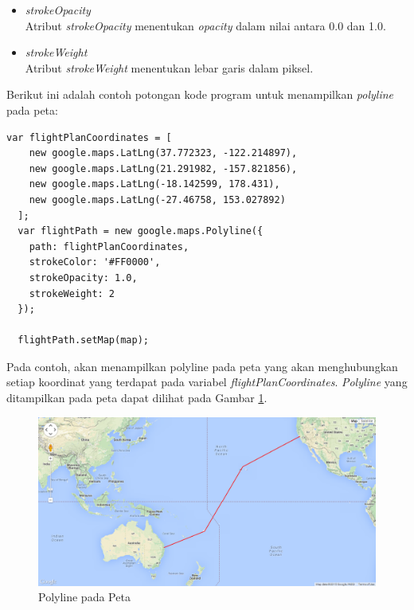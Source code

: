 \begin{enumerate}
\begin{itemize}
  \item \textit{strokeOpacity} \\
  Atribut \textit{strokeOpacity} menentukan \textit{opacity} dalam nilai antara
  0.0 dan 1.0.
  
  \item \textit{strokeWeight} \\
  Atribut \textit{strokeWeight} menentukan lebar garis dalam piksel.
\end{itemize}
Berikut ini adalah contoh potongan kode program untuk menampilkan
\textit{polyline} pada peta:
\begin{verbatim}
var flightPlanCoordinates = [
    new google.maps.LatLng(37.772323, -122.214897),
    new google.maps.LatLng(21.291982, -157.821856),
    new google.maps.LatLng(-18.142599, 178.431),
    new google.maps.LatLng(-27.46758, 153.027892)
  ];
  var flightPath = new google.maps.Polyline({
    path: flightPlanCoordinates,
    strokeColor: '#FF0000',
    strokeOpacity: 1.0,
    strokeWeight: 2
  });

  flightPath.setMap(map);
\end{verbatim}
Pada contoh, akan menampilkan polyline pada peta yang akan menghubungkan setiap 
koordinat yang terdapat pada variabel \textit{flightPlanCoordinates}.
\textit{Polyline} yang ditampilkan pada peta dapat dilihat pada Gambar \ref{fig:polyline}.
\begin{figure}[h]
\centering
\includegraphics[scale=0.4]{Gambar/polyline}
\caption[Polyline pada Peta]{Polyline pada Peta}
\label{fig:polyline}
\end{figure}
\end{enumerate}

